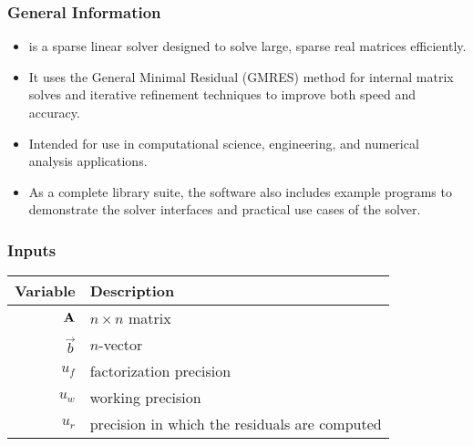 \documentclass[t,12pt,numbers,fleqn]{beamer}
\begin{document}



\begin{frame}
\frametitle{General Information}

\begin{itemize}
\item \progname{} is a sparse linear solver designed to solve large, sparse real
  matrices efficiently.
\item It uses the General Minimal Residual (GMRES) method for internal matrix
  solves and iterative refinement techniques to improve both speed and accuracy.
\item Intended for use in computational science, engineering, and numerical
  analysis applications.
\item As a complete library suite, the software also includes example programs to
  demonstrate the solver interfaces and practical use cases of the solver.
\end{itemize}

\end{frame}


\begin{frame}
\frametitle{Inputs}

\begin{table}[hp]
  \centering
  \label{tab:inputs}
  \begin{tabularx}{1.0\linewidth}{rX}
    \toprule
    \textbf{Variable}  & \textbf{Description} \\
    \midrule
    \(\mathbf{A}\) & \(n \times n\) matrix \\
    \(\vec{b}\)        & \(n\)-vector \\
    \(u_f\)       & factorization precision \\
    \(u_w\)       & working precision \\
    \(u_r\)       & precision in which the residuals are computed \\
    \bottomrule
  \end{tabularx}
\end{table}

\end{frame}

\end{document}
